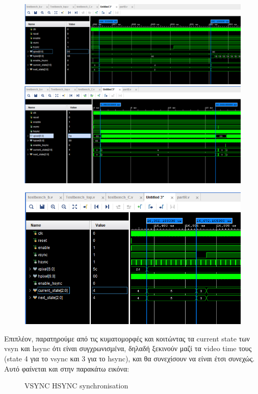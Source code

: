 \documentclass[12pt,a4paper]{article}
\begin{document}
	\begin{figure}[H]
	\centering
	\includegraphics[width=.4\linewidth]{pictures/hsync enable time}
	\centering
	\includegraphics[width=.4\linewidth]{pictures/v display time}
	\end{figure}

	\begin{figure}[H]
	\centering
	\includegraphics[width=.6\linewidth]{pictures/v front porch time}
	\end{figure}

	Επιπλέον, παρατηρούμε από τις κυματομορφές και κοιτώντας τα current state των vsyn και hsync ότι είναι συγχρωνισμένα, δηλαδή ξεκινούν μαζί τα video time τους (state 4 για το vsync και 3 για το hsync), και θα συνεχίσουν να είναι έτσι συνεχώς. Αυτό φαίνεται και στην παρακάτω εικόνα:
	\begin{figure} [H]
		\caption{VSYNC HSYNC synchronisation}
		\label{VSYNC HSYNC synchronisation}
	\end{figure}
	
\end{document}
